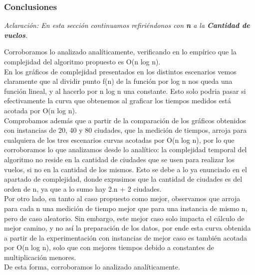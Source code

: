 \subsubsection{Conclusiones}
\textit{Aclaración: En esta sección continuamos refiriéndonos con \textbf{n} a la \textbf{Cantidad de vuelos}.}

\noindent Corroboramos lo analizado analíticamente, verificando en lo empírico que la complejidad del algoritmo propuesto es O(n log n).\\
\noindent En los gráficos de complejidad presentados en los distintos escenarios vemos claramente que al dividir punto f(n) de la función por log n nos queda una función lineal, y al hacerlo por n log n una constante. Esto solo podria pasar si efectivamente la curva que obtenemos al graficar los tiempos medidos está acotada por O(n log n).\\
\noindent Comprobamos además que a partir de la comparación de los gráficos obtenidos con instancias de 20, 40 y 80 ciudades, que la medición de tiempos, arroja para cualquiera de los tres escenarios curvas acotadas por O(n log n), por lo que corroboramos lo que analizamos desde lo analítico: la complejidad temporal del algoritmo no reside en la cantidad de ciudades que se usen para realizar los vuelos, si no en la cantidad de los mismos. Esto se debe a lo ya enunciado en el apartado de complejidad, donde expusimos que la cantidad de ciudades es del orden de n, ya que a lo sumo hay 2.n + 2 ciudades.\\
\noindent Por otro lado, en tanto al caso propuesto como mejor, observamos que arroja para cada n una medición de tiempo mejor que para una instancia de mismo n, pero de caso aleatorio. Sin embargo, este mejor caso solo impacta el cálculo de mejor camino, y no así la preparación de los datos, por ende esta curva obtenida a partir de la experimentación con instancias de mejor caso es también acotada por O(n log n), solo que con mejores tiempos debido a constantes de multiplicación menores.\\
\noindent De esta forma, corroboramos lo analizado analíticamente.\\